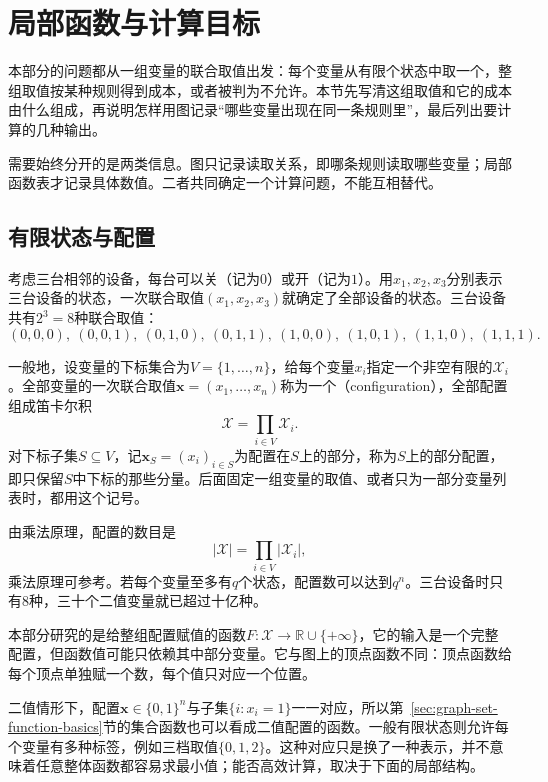 
\section{局部函数与计算目标}
\label{sec:graph-local-functions}

本部分的问题都从一组变量的联合取值出发：每个变量从有限个状态中取一个，整组取值按某种规则得到成本，或者被判为不允许。本节先写清这组取值和它的成本由什么组成，再说明怎样用图记录“哪些变量出现在同一条规则里”，最后列出要计算的几种输出。

需要始终分开的是两类信息。图只记录读取关系，即哪条规则读取哪些变量；局部函数表才记录具体数值。二者共同确定一个计算问题，不能互相替代。

\subsection{有限状态与配置}
\label{sec:graph-dp-configurations}

考虑三台相邻的设备，每台可以关（记为$0$）或开（记为$1$）。用$x_1,x_2,x_3$分别表示三台设备的状态，一次联合取值$(x_1,x_2,x_3)$就确定了全部设备的状态。三台设备共有$2^3=8$种联合取值：
\[
(0,0,0),\ (0,0,1),\ (0,1,0),\ (0,1,1),\ (1,0,0),\ (1,0,1),\ (1,1,0),\ (1,1,1).
\]

一般地，设变量的下标集合为$V=\{1,\ldots,n\}$，给每个变量$x_i$指定一个非空有限的$\mathcal X_i$。全部变量的一次联合取值$\bm x=(x_1,\ldots,x_n)$称为一个（configuration），全部配置组成笛卡尔积
\[
\mathcal X=\prod_{i\in V}\mathcal X_i .
\]
对下标子集$S\subseteq V$，记$\bm x_S=(x_i)_{i\in S}$为配置在$S$上的部分，称为$S$上的部分配置，即只保留$S$中下标的那些分量。后面固定一组变量的取值、或者只为一部分变量列表时，都用这个记号。

由乘法原理，配置的数目是
\[
|\mathcal X|=\prod_{i\in V}|\mathcal X_i|,
\]
乘法原理可参考。若每个变量至多有$q$个状态，配置数可以达到$q^n$。三台设备时只有$8$种，三十个二值变量就已超过十亿种。

本部分研究的是给整组配置赋值的函数$F:\mathcal X\to\mathbb R\cup\{+\infty\}$，它的输入是一个完整配置，但函数值可能只依赖其中部分变量。它与图上的顶点函数不同：顶点函数给每个顶点单独赋一个数，每个值只对应一个位置。

二值情形下，配置$\bm x\in\{0,1\}^n$与子集$\{i:x_i=1\}$一一对应，所以第~\ref{sec:graph-set-function-basics}节的集合函数也可以看成二值配置的函数。一般有限状态则允许每个变量有多种标签，例如三档取值$\{0,1,2\}$。这种对应只是换了一种表示，并不意味着任意整体函数都容易求最小值；能否高效计算，取决于下面的局部结构。

